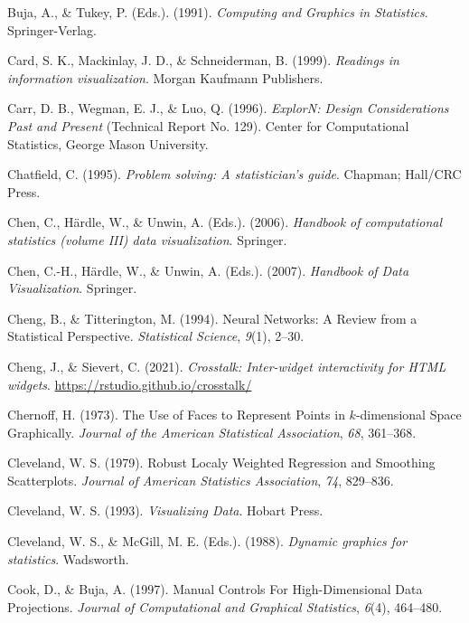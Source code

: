 \documentclass[
  letterpaper,
]{krantz}
\newlength{\cslhangindent}
\newenvironment{CSLReferences}[2] %
 {\begin{list}{}{%
  \setlength{\itemindent}{0pt}
  \setlength{\leftmargin}{0pt}
  \setlength{\parsep}{0pt}
  \ifodd #1
   \setlength{\leftmargin}{\cslhangindent}
   \setlength{\itemindent}{-1\cslhangindent}
  \fi
  \setlength{\itemsep}{#2\baselineskip}}}
 {\end{list}}
\begin{document}
\begin{CSLReferences}{1}{0}
Buja, A., \& Tukey, P. (Eds.). (1991). \emph{Computing and {G}raphics in
{S}tatistics}. Springer-Verlag.

Card, S. K., Mackinlay, J. D., \& Schneiderman, B. (1999).
\emph{Readings in information visualization}. Morgan Kaufmann
Publishers.

Carr, D. B., Wegman, E. J., \& Luo, Q. (1996). \emph{Explor{N}: {D}esign
{C}onsiderations {P}ast and {P}resent} (Technical Report No. 129).
Center for Computational Statistics, George Mason University.

Chatfield, C. (1995). \emph{Problem solving: A statistician's guide}.
Chapman; Hall/CRC Press.

Chen, C., Härdle, W., \& Unwin, A. (Eds.). (2006). \emph{Handbook of
computational statistics (volume III) data visualization}. Springer.

Chen, C.-H., Härdle, W., \& Unwin, A. (Eds.). (2007). \emph{Handbook of
{D}ata {V}isualization}. Springer.

Cheng, B., \& Titterington, M. (1994). Neural {N}etworks: {A} {R}eview
from a {S}tatistical {P}erspective. \emph{Statistical Science},
\emph{9}(1), 2--30.

Cheng, J., \& Sievert, C. (2021). \emph{Crosstalk: Inter-widget
interactivity for HTML widgets}.
\url{https://rstudio.github.io/crosstalk/}

Chernoff, H. (1973). The {U}se of {F}aces to {R}epresent {P}oints in
\(k\)-dimensional {S}pace {G}raphically. \emph{Journal of the American
Statistical Association}, \emph{68}, 361--368.

Cleveland, W. S. (1979). Robust {L}ocaly {W}eighted {R}egression and
{S}moothing {S}catterplots. \emph{Journal of American Statistics
Association}, \emph{74}, 829--836.

Cleveland, W. S. (1993). \emph{Visualizing {D}ata}. Hobart Press.

Cleveland, W. S., \& McGill, M. E. (Eds.). (1988). \emph{Dynamic
graphics for statistics}. Wadsworth.

Cook, D., \& Buja, A. (1997). {M}anual {C}ontrols {F}or
{H}igh-{D}imensional {D}ata {P}rojections. \emph{Journal of
Computational and Graphical Statistics}, \emph{6}(4), 464--480.


\end{CSLReferences}
\end{document}
